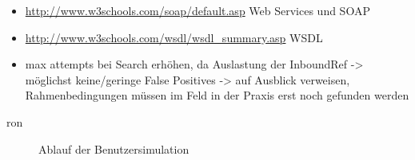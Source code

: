 \begin{itemize}
\item \url{http://www.w3schools.com/soap/default.asp} Web Services und SOAP
\item \url{http://www.w3schools.com/wsdl/wsdl_summary.asp} WSDL
\item max attempts bei Search erhöhen, da Auslastung der InboundRef -> möglichst keine/geringe False Positives -> auf Ausblick verweisen, Rahmenbedingungen müssen im Feld in der Praxis erst noch gefunden werden
\end{itemize}ron

\begin{figure}[ht]
	\centering
		\caption{Ablauf der Benutzersimulation}
		\label{usersim}
\end{figure}

